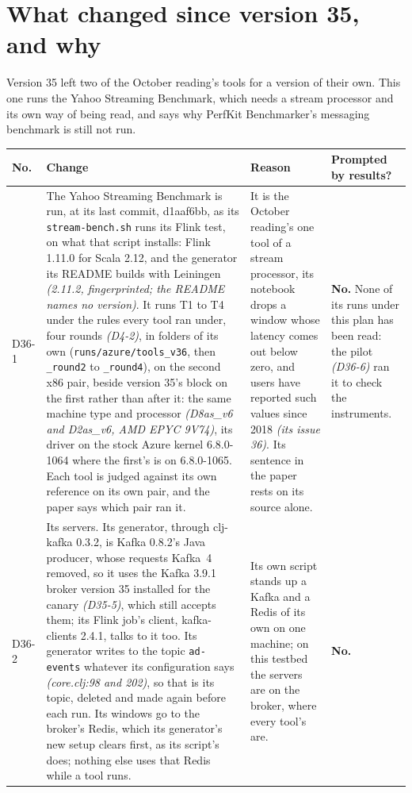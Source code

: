 \documentclass[11pt]{article}
\newcommand{\gl}[1]{{\color{soft}\itshape\small (#1)}}
\begin{document}
\section*{What changed since version 35, and why}
Version 35 left two of the October reading's tools for a version of their own. This one runs the
Yahoo Streaming Benchmark, which needs a stream processor and its own way of being read, and says
why PerfKit Benchmarker's messaging benchmark is still not run.

{\small
\begin{longtable}{@{}p{1.1cm} >{\raggedright\arraybackslash}p{6.1cm} >{\raggedright\arraybackslash}p{6.0cm} >{\raggedright\arraybackslash}p{2.2cm}@{}}
\toprule
\textbf{No.} & \textbf{Change} & \textbf{Reason} & \textbf{Prompted by results?} \\
\midrule
\endhead
D36-1 & The Yahoo Streaming Benchmark is run, at its last commit, d1aaf6bb, as its \texttt{stream-bench.sh} runs its Flink test, on what that script installs: Flink 1.11.0 for Scala 2.12, and the generator its README builds with Leiningen \gl{2.11.2, fingerprinted; the README names no version}. It runs T1 to T4 under the rules every tool ran under, four rounds \gl{D4-2}, in folders of its own (\texttt{runs/azure/tools\_v36}, then \texttt{\_round2} to \texttt{\_round4}), on the second x86 pair, beside version 35's block on the first rather than after it: the same machine type and processor \gl{D8as\_v6 and D2as\_v6, AMD EPYC 9V74}, its driver on the stock Azure kernel 6.8.0-1064 where the first's is on 6.8.0-1065. Each tool is judged against its own reference on its own pair, and the paper says which pair ran it. & It is the October reading's one tool of a stream processor, its notebook drops a window whose latency comes out below zero, and users have reported such values since 2018 \gl{its issue 36}. Its sentence in the paper rests on its source alone. & \textbf{No.} None of its runs under this plan has been read: the pilot \gl{D36-6} ran it to check the instruments. \\
D36-2 & Its servers. Its generator, through clj-kafka 0.3.2, is Kafka 0.8.2's Java producer, whose requests Kafka~4 removed, so it uses the Kafka 3.9.1 broker version 35 installed for the canary \gl{D35-5}, which still accepts them; its Flink job's client, kafka-clients 2.4.1, talks to it too. Its generator writes to the topic \texttt{ad-events} whatever its configuration says \gl{core.clj:98 and 202}, so that is its topic, deleted and made again before each run. Its windows go to the broker's Redis, which its generator's new setup clears first, as its script's does; nothing else uses that Redis while a tool runs. & Its own script stands up a Kafka and a Redis of its own on one machine; on this testbed the servers are on the broker, where every tool's are. & \textbf{No.} \\

\end{longtable}}
\end{document}
